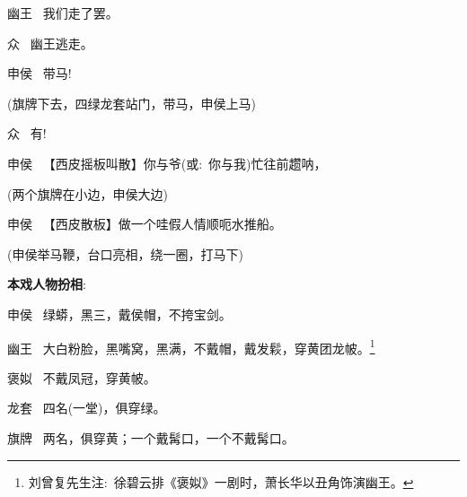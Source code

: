 {\textrm{幽王\hspace{30pt}~ 我们走了罢。}

\textrm{众\hspace{41pt}~ 幽王逃走。}

\textrm{申侯\hspace{30pt}~ 带马!}

\textrm{(旗牌{\hwfs 下去}，{\hwfs 四绿}龙套{\hwfs 站门}，{\hwfs 带马}，申侯{\hwfs 上马})}


\textrm{众\hspace{41pt}~ 有!}

\textrm{申侯\hspace{30pt}~ 【{\akai 西皮摇板}{\footnotesize 叫散}】你与爷({\akai 或}:~你与我)忙往前趱{\footnotesize 呐}，}

\textrm{({\hwfs 两个}旗牌{\hwfs 在小边}，申侯{\hwfs 大边})}

\textrm{申侯\hspace{30pt}~ 【{\akai 西皮散板}】做一个{\footnotesize 哇}假人情顺{\footnotesize 呃}水推船。}

\textrm{(申侯{\hwfs 举马鞭}，{\hwfs 台口亮相}，{\hwfs 绕一圈}，{\hwfs 打马下})}
}

\vspace{15pt}
{\bfseries\textrm{本戏人物扮相}}:~
\vspace{15pt}

申侯\hspace{30pt}~ 绿蟒，黑三，戴侯帽，不挎宝剑。

幽王\hspace{30pt}~ 大白粉脸，黑嘴窝，黑满，不戴帽，戴发鬏，穿黄团龙帔。\footnote{刘曾复先生注:~徐碧云排《褒姒》一剧时，萧长华以丑角饰演幽王。}%

褒姒\hspace{30pt}~ 不戴凤冠，穿黄帔。

龙套\hspace{30pt}~ 四名(一堂)，俱穿绿。

旗牌\hspace{30pt}~ 两名，俱穿黄；一个戴髯口，一个不戴髯口。

